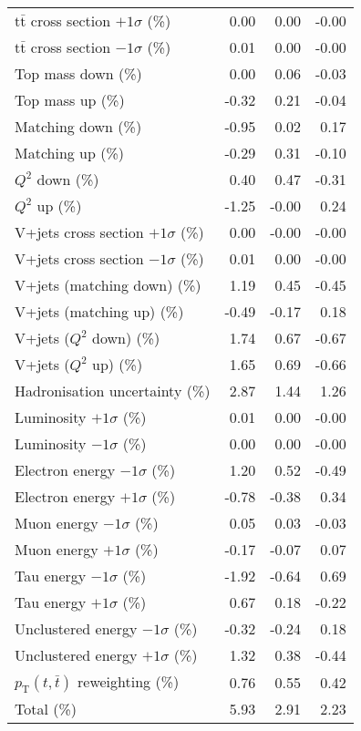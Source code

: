 \begin{table}[htbp]
{\begin{tabular}{lrrr}
$\mathrm{t}\bar{\mathrm{t}}$ cross section $+1\sigma$ (\%) & 0.00 & 0.00 & -0.00 \\ 
$\mathrm{t}\bar{\mathrm{t}}$ cross section $-1\sigma$ (\%) & 0.01 & 0.00 & -0.00 \\ 
Top mass down (\%) & 0.00 & 0.06 & -0.03 \\ 
Top mass up (\%) & -0.32 & 0.21 & -0.04 \\ 
Matching down (\%) & -0.95 & 0.02 & 0.17 \\ 
Matching up (\%) & -0.29 & 0.31 & -0.10 \\ 
$Q^{2}$ down (\%) & 0.40 & 0.47 & -0.31 \\ 
$Q^{2}$ up (\%) & -1.25 & -0.00 & 0.24 \\ 
V+jets cross section \ensuremath{+1\sigma} (\%) & 0.00 & -0.00 & -0.00 \\ 
V+jets cross section \ensuremath{-1\sigma} (\%) & 0.01 & 0.00 & -0.00 \\ 
V+jets (matching down) (\%) & 1.19 & 0.45 & -0.45 \\ 
V+jets (matching up) (\%) & -0.49 & -0.17 & 0.18 \\ 
V+jets ($Q^{2}$ down) (\%) & 1.74 & 0.67 & -0.67 \\ 
V+jets ($Q^{2}$ up) (\%) & 1.65 & 0.69 & -0.66 \\ 
Hadronisation uncertainty (\%) & 2.87 & 1.44 & 1.26 \\ 
Luminosity $+1\sigma$ (\%) & 0.01 & 0.00 & -0.00 \\ 
Luminosity $-1\sigma$ (\%) & 0.00 & 0.00 & -0.00 \\ 
Electron energy $-1\sigma$ (\%) & 1.20 & 0.52 & -0.49 \\ 
Electron energy $+1\sigma$ (\%) & -0.78 & -0.38 & 0.34 \\ 
Muon energy $-1\sigma$ (\%) & 0.05 & 0.03 & -0.03 \\ 
Muon energy $+1\sigma$ (\%) & -0.17 & -0.07 & 0.07 \\ 
Tau energy $-1\sigma$ (\%) & -1.92 & -0.64 & 0.69 \\ 
Tau energy $+1\sigma$ (\%) & 0.67 & 0.18 & -0.22 \\ 
Unclustered energy $-1\sigma$ (\%) & -0.32 & -0.24 & 0.18 \\ 
Unclustered energy $+1\sigma$ (\%) & 1.32 & 0.38 & -0.44 \\ 
$p_\mathrm{T}(t,\bar{t})$ reweighting (\%) & 0.76 & 0.55 & 0.42 \\ 
\hline 
Total (\%) & 5.93  & 2.91  & 2.23 \\ 
\hline 
\end{tabular}
}
\end{table}
